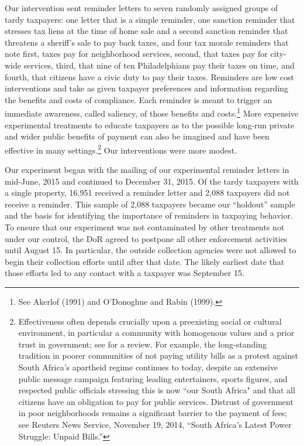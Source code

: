 \documentclass[12pt]{article}
\begin{document}
Our intervention sent reminder letters to seven randomly assigned
groups of tardy taxpayers: one letter that is a simple reminder, one
sanction reminder that stresses tax liens at the time of home sale and
a second sanction reminder that threatens a sheriff's sale to pay back
taxes, and four tax morale reminders that note first, taxes pay for
neighborhood services, second, that taxes pay for city-wide services,
third, that nine of ten Philadelphians pay their taxes on time, and
fourth, that citizens have a civic duty to pay their taxes.  Reminders
are low cost interventions and take as given taxpayer preferences and
information regarding the benefits and costs of compliance.  Each
reminder is meant to trigger an immediate awareness, called saliency,
of those benefits and costs.\footnote{See Akerlof (1991) and
  O'Donoghue and Rabin (1999).}  More expensive experimental
treatments to educate taxpayers as to the possible long-run private
and wider public benefits of payment can also be imagined and have
been effective in many settings.\footnote{Effectiveness often depends
  crucially upon a preexisting social or cultural environment, in
  particular a community with homogenous values and a prior trust in
  government; see  for a review.  For example, the
  long-standing tradition in poorer communities of not paying utility
  bills as a protest against South Africa's apartheid regime continues
  to today, despite an extensive public message campaign featuring
  leading entertainers, sports figures, and respected public officials
  stressing this is now ``our South Africa" and that all citizens have an
  obligation to pay for public services.  Distrust of government in
  poor neighborhoods remains a significant barrier to the payment of
  fees; see Reuters News Service, November 19, 2014, ``South Africa's
  Latest Power Struggle: Unpaid Bills.'' } Our interventions were more
modest.

Our experiment began with the mailing of our experimental reminder
letters in mid-June, 2015 and continued to December 31, 2015.  Of the
tardy taxpayers with a single property, 16,951 received a reminder
letter and 2,088 taxpayers did not receive a reminder.  This sample of
2,088 taxpayers became our ``holdout'' sample and the basis for
identifying the importance of reminders in taxpaying behavior. To
ensure that our experiment was not contaminated by other treatments
not under our control, the DoR agreed to postpone all other
enforcement activities until August 15.  In particular, the outside
collection agencies were not allowed to begin their collection efforts
until after that date.  The likely earliest date that those efforts
led to any contact with a taxpayer was September 15.
\end{document}
